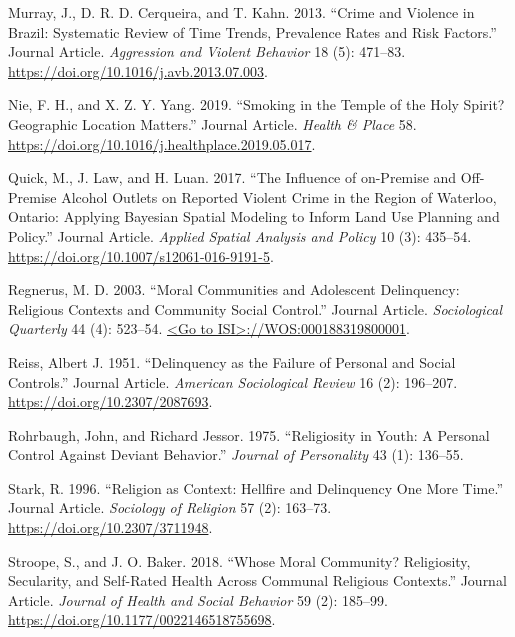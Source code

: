 \documentclass[smallextended]{svjour3}       %
\begin{document}
\leavevmode\hypertarget{ref-Murray2013crime}{}%
Murray, J., D. R. D. Cerqueira, and T. Kahn. 2013. ``Crime and Violence
in Brazil: Systematic Review of Time Trends, Prevalence Rates and Risk
Factors.'' Journal Article. \emph{Aggression and Violent Behavior} 18
(5): 471--83. \url{https://doi.org/10.1016/j.avb.2013.07.003}.

\leavevmode\hypertarget{ref-Nie2019smoking}{}%
Nie, F. H., and X. Z. Y. Yang. 2019. ``Smoking in the Temple of the Holy
Spirit? Geographic Location Matters.'' Journal Article. \emph{Health \&
Place} 58. \url{https://doi.org/10.1016/j.healthplace.2019.05.017}.

\leavevmode\hypertarget{ref-Quick2017influence}{}%
Quick, M., J. Law, and H. Luan. 2017. ``The Influence of on-Premise and
Off-Premise Alcohol Outlets on Reported Violent Crime in the Region of
Waterloo, Ontario: Applying Bayesian Spatial Modeling to Inform Land Use
Planning and Policy.'' Journal Article. \emph{Applied Spatial Analysis
and Policy} 10 (3): 435--54.
\url{https://doi.org/10.1007/s12061-016-9191-5}.

\leavevmode\hypertarget{ref-Regnerus2003moral}{}%
Regnerus, M. D. 2003. ``Moral Communities and Adolescent Delinquency:
Religious Contexts and Community Social Control.'' Journal Article.
\emph{Sociological Quarterly} 44 (4): 523--54.
\href{\%3CGo\%20to\%20ISI\%3E://WOS:000188319800001}{\textless{}Go to ISI\textgreater{}://WOS:000188319800001}.

\leavevmode\hypertarget{ref-Reiss1951delinquency}{}%
Reiss, Albert J. 1951. ``Delinquency as the Failure of Personal and
Social Controls.'' Journal Article. \emph{American Sociological Review}
16 (2): 196--207. \url{https://doi.org/10.2307/2087693}.

\leavevmode\hypertarget{ref-Rohrbaugh1975religiosity}{}%
Rohrbaugh, John, and Richard Jessor. 1975. ``Religiosity in Youth: A
Personal Control Against Deviant Behavior.'' \emph{Journal of
Personality} 43 (1): 136--55.

\leavevmode\hypertarget{ref-Stark1996religion}{}%
Stark, R. 1996. ``Religion as Context: Hellfire and Delinquency One More
Time.'' Journal Article. \emph{Sociology of Religion} 57 (2): 163--73.
\url{https://doi.org/10.2307/3711948}.

\leavevmode\hypertarget{ref-Stroope2018moral}{}%
Stroope, S., and J. O. Baker. 2018. ``Whose Moral Community?
Religiosity, Secularity, and Self-Rated Health Across Communal Religious
Contexts.'' Journal Article. \emph{Journal of Health and Social
Behavior} 59 (2): 185--99.
\url{https://doi.org/10.1177/0022146518755698}.
\end{document}
